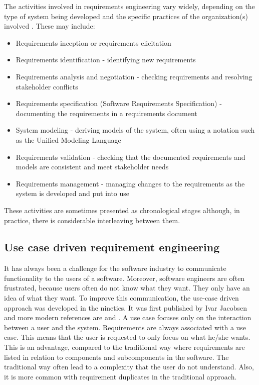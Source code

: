 The activities involved in requirements engineering vary widely, depending on the type of system being developed and the specific practices of the organization(s) involved  \cite{Som11}.  These may include:
\begin{itemize}
\item Requirements inception or requirements elicitation 
\item Requirements identification - identifying new requirements
\item Requirements analysis and negotiation - checking requirements and resolving stakeholder conflicts
\item Requirements specification (Software Requirements Specification) - documenting the requirements in a requirements document
\item System modeling - deriving models of the system, often using a notation such as the Unified Modeling Language
\item Requirements validation - checking that the documented requirements and models are consistent and meet stakeholder needs
\item Requirements management - managing changes to the requirements as the system is developed and put into use
\end{itemize}

These activities are sometimes presented as chronological stages although, in practice, there is considerable interleaving between them.  

\subsection{Use case driven requirement engineering}

It has always been a challenge for the software industry to communicate functionality to the users of a software. Moreover, software engineers are often frustrated, because users often do not know what they want. They only have an idea of what they want.  To improve this communication, the use-case driven approach was developed in the nineties.  It was first published by Ivar Jacobsen \cite{Jac92} and more modern references are \cite{Poh10} and \cite{Coc01}.  A use case focuses only on the interaction between a user and the system.  Requirements are always associated with a use case. This means that the user is requested to only focus on what he/she wants.  This is an advantage, compared to the traditional way where requirements are listed in relation to components and subcomponents in the software.  The traditional way often lead to a complexity that the user do not understand.  Also, it is more common with requirement duplicates in the traditional approach.

